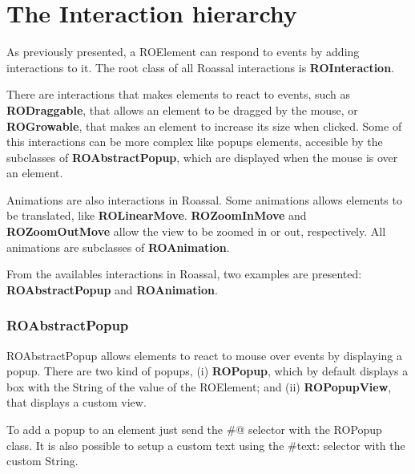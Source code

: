 \documentclass[a4paper,10pt,twoside]{book}
\begin{document}
\section{The Interaction hierarchy}

As previously presented, a ROElement can respond to events by adding interactions to it. The root class of all Roassal interactions is \textbf{ROInteraction}.

There are interactions that makes elements to react to events, such as \textbf{RODraggable}, that allows an element to be dragged by the mouse, or \textbf{ROGrowable}, that makes an element to increase its size when clicked. Some of this interactions can be more complex like popups elements, accesible by the subclasses of \textbf{ROAbstractPopup}, which are displayed when the mouse is over an element. 

Animations are also interactions in Roassal. Some animations allows elements to be translated, like \textbf{ROLinearMove}. \textbf{ROZoomInMove} and \textbf{ROZoomOutMove} allow the view to be zoomed in or out, respectively. All animations are subclasses of \textbf{ROAnimation}.

From the availables interactions in Roassal, two examples are presented: \textbf{ROAbstractPopup} and \textbf{ROAnimation}.

\subsubsection*{ROAbstractPopup}

ROAbstractPopup allows elements to react to mouse over events by displaying a popup. There are two kind of popups, (i) \textbf{ROPopup}, which by default displays a box with the String of the value of the ROElement; and (ii) \textbf{ROPopupView}, that displays a custom view.

To add a popup to an element just send the \#@ selector with the ROPopup class. It is also possible to setup a custom text using the \#text: selector with the custom String.
\end{document}
